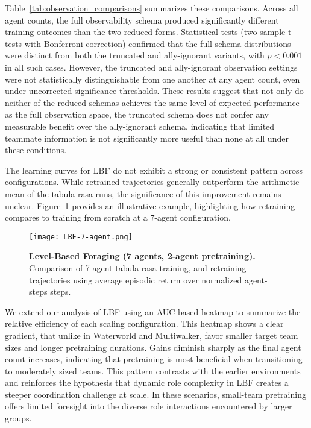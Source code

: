 \documentclass{article}
\begin{document}
Table~\ref{tab:observation_comparisons} summarizes these comparisons. Across all agent counts, 
the full observability schema produced significantly different training outcomes 
than the two reduced forms. Statistical tests (two-sample t-tests with Bonferroni correction) 
confirmed that the full schema distributions were distinct from both the 
truncated and ally-ignorant variants, with $p < 0.001$ in all such cases. 
However, the truncated and ally-ignorant observation settings were not 
statistically distinguishable from one another at any agent count, 
even under uncorrected significance thresholds. 
These results suggest that not only do neither of the reduced schemas 
achieves the same level of expected performance as the full observation space, 
the truncated schema does not confer any measurable benefit over 
the ally-ignorant schema, indicating that limited teammate information is not 
significantly more useful than none at all under these conditions.

The learning curves for LBF do not exhibit a strong or consistent pattern across configurations. 
While retrained trajectories generally outperform the arithmetic mean of the tabula rasa runs, 
the significance of this improvement remains unclear. 
Figure~\ref{fig:lbf-7} provides an illustrative example, highlighting how retraining compares 
to training from scratch at a 7-agent configuration.

\begin{figure}[!h]
    \centering
    \texttt{[image: LBF-7-agent.png]}
    \caption{\textbf{Level-Based Foraging (7 agents, 2-agent pretraining).} Comparison of 
    7 agent tabula rasa training, and retraining trajectories using average 
    episodic return over normalized agent-steps steps.}
    \label{fig:lbf-7}
\end{figure}

We extend our analysis of LBF using an AUC-based heatmap to summarize the 
relative efficiency of each scaling configuration. 
This heatmap shows a clear gradient, that unlike in Waterworld and Multiwalker, 
favor smaller target team sizes and longer pretraining durations. 
Gains diminish sharply as the final agent count increases, 
indicating that pretraining is most beneficial when transitioning to moderately sized teams. 
This pattern contrasts with the earlier environments and reinforces the hypothesis that 
dynamic role complexity in LBF creates a steeper coordination challenge at scale. 
In these scenarios, small-team pretraining offers limited foresight into the diverse role 
interactions encountered by larger groups.
\end{document}
